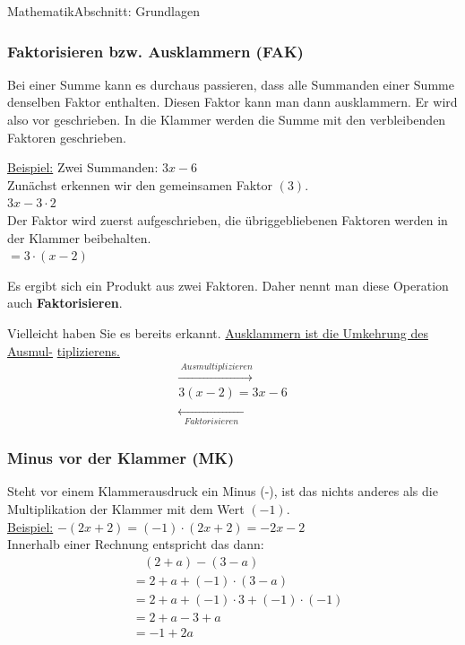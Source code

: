 \documentclass[11pt,twocolumn,oneside,openany,headings=optiontotoc,11pt,numbers=noenddot]{article}
\begin{document}
\begin{worksheet}{}{Mathematik}{Abschnitt: Grundlagen}
		\subsubsection*{Faktorisieren bzw. Ausklammern (FAK)}
		Bei einer Summe kann es durchaus passieren, dass alle Summanden einer Summe denselben Faktor enthalten. Diesen Faktor kann man dann ausklammern. Er wird also vor geschrieben. In die Klammer werden die Summe mit den verbleibenden Faktoren geschrieben.\\
		\par\noindent
		\underline{Beispiel:} Zwei Summanden: \(3x - 6\)\\
		Zunächst erkennen wir den gemeinsamen Faktor \((3)\).\\
		\(\mbox{3}x - \mbox{3}\cdot{}2\)\\
		Der Faktor wird zuerst aufgeschrieben, die übriggebliebenen Faktoren werden in der Klammer beibehalten.\\
		\(= \mbox{3}\cdot{}(x - 2)\)\\
		\par\noindent
		Es ergibt sich ein Produkt aus zwei Faktoren. Daher nennt man diese Operation auch \textbf{Faktorisieren}.\\
		\par\noindent
		Vielleicht haben Sie es bereits erkannt. \underline{Ausklammern ist die Umkehrung des Ausmul-} \underline{tiplizierens.}
		\begin{align*}
			\xrightarrow{\ Ausmultiplizieren}\\
			3(x-2) = 3x - 6\\
			\xleftarrow[\ \ \ Faktorisieren\ \ \ ]{}
		\end{align*}
		\subsubsection*{Minus vor der Klammer (MK)}
		Steht vor einem Klammerausdruck ein Minus (-), ist das nichts anderes als die Multiplikation der Klammer mit dem Wert \((-1)\).\\
		\underline{Beispiel:} \(-(2x + 2) = (-1)\cdot{}(2x+2) = -2x - 2\)\\
		Innerhalb einer Rechnung entspricht das dann:
		\begin{align*}
			& \ \ \ \ (2+a) - (3 - a)\\
			& = 2 + a + (-1)\cdot{}(3-a)\\
			& = 2 + a + (-1)\cdot{}3 + (-1)\cdot{}(-1)\\
			& = 2 + a - 3 + a\\
			& = -1 + 2a
		\end{align*}

\end{worksheet}
\end{document}
